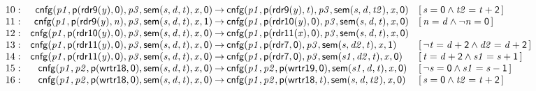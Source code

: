 \documentclass[a4paper]{article}
\newcommand{\symb}[1]{\mathsf{#1}}
\newcommand{\var}[1]{\mathit{#1}}
\newcommand{\Constraint}[1]{[\, #1 \,]}
\begin{document}
\begin{landscape}
\[\begin{array}{rr@{\>}c@{\>}ll}
\mathrm{10} : 
 & \symb{cnfg}(\var{p1},\symb{p}(\symb{rdr9}(\var{y}),\symb{0}),\var{p3},\symb{sem}(\var{s},\var{d},\var{t}),\var{x},\symb{0})
 & \to 
 & \symb{cnfg}(\var{p1},\symb{p}(\symb{rdr9}(\var{y}),\var{t}),\var{p3},\symb{sem}(\var{s},\var{d},\var{t2}),\var{x},\symb{0})
 & \Constraint{\var{s} = \symb{0} \land \var{t2} = \var{t} + \symb{2}}\\

\mathrm{11} : 
 & \symb{cnfg}(\var{p1},\symb{p}(\symb{rdr9}(\var{y}),\var{n}),\var{p3},\symb{sem}(\var{s},\var{d},\var{t}),\var{x},\symb{1})
 & \to 
 & \symb{cnfg}(\var{p1},\symb{p}(\symb{rdr10}(\var{y}),\symb{0}),\var{p3},\symb{sem}(\var{s},\var{d},\var{t}),\var{x},\symb{0})
 & \Constraint{\var{n} = \var{d} \land \neg \var{n} = \symb{0}}\\

\mathrm{12} : 
 & \symb{cnfg}(\var{p1},\symb{p}(\symb{rdr10}(\var{y}),\symb{0}),\var{p3},\symb{sem}(\var{s},\var{d},\var{t}),\var{x},\symb{0})
 & \to 
 & \symb{cnfg}(\var{p1},\symb{p}(\symb{rdr11}(\var{x}),\symb{0}),\var{p3},\symb{sem}(\var{s},\var{d},\var{t}),\var{x},\symb{0})\\

\mathrm{13} : 
 & \symb{cnfg}(\var{p1},\symb{p}(\symb{rdr11}(\var{y}),\symb{0}),\var{p3},\symb{sem}(\var{s},\var{d},\var{t}),\var{x},\symb{0})
 & \to 
 & \symb{cnfg}(\var{p1},\symb{p}(\symb{rdr7},\symb{0}),\var{p3},\symb{sem}(\var{s},\var{d2},\var{t}),\var{x},\symb{1})
 & \Constraint{\neg \var{t} = \var{d} + \symb{2} \land \var{d2} = \var{d} + \symb{2}}\\

\mathrm{14} : 
 & \symb{cnfg}(\var{p1},\symb{p}(\symb{rdr11}(\var{y}),\symb{0}),\var{p3},\symb{sem}(\var{s},\var{d},\var{t}),\var{x},\symb{0})
 & \to 
 & \symb{cnfg}(\var{p1},\symb{p}(\symb{rdr7},\symb{0}),\var{p3},\symb{sem}(\var{s1},\var{d2},\var{t}),\var{x},\symb{0})
 & \Constraint{\var{t} = \var{d} + \symb{2} \land \var{s1} = \var{s} + \symb{1}}\\

\mathrm{15} : 
 & \symb{cnfg}(\var{p1},\var{p2},\symb{p}(\symb{wrtr18},\symb{0}),\symb{sem}(\var{s},\var{d},\var{t}),\var{x},\symb{0})
 & \to 
 & \symb{cnfg}(\var{p1},\var{p2},\symb{p}(\symb{wrtr19},\symb{0}),\symb{sem}(\var{s1},\var{d},\var{t}),\var{x},\symb{0})
 & \Constraint{\neg \var{s} = \symb{0} \land \var{s1} = \var{s} - \symb{1}}\\

\mathrm{16} : 
 & \symb{cnfg}(\var{p1},\var{p2},\symb{p}(\symb{wrtr18},\symb{0}),\symb{sem}(\var{s},\var{d},\var{t}),\var{x},\symb{0})
 & \to 
 & \symb{cnfg}(\var{p1},\var{p2},\symb{p}(\symb{wrtr18},\var{t}),\symb{sem}(\var{s},\var{d},\var{t2}),\var{x},\symb{0})
 & \Constraint{\var{s} = \symb{0} \land \var{t2} = \var{t} + \symb{2}}\\


\end{array}\]
\end{landscape}
\end{document}
